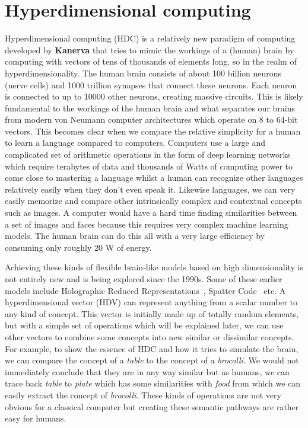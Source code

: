 \section{Hyperdimensional computing} 
Hyperdimensional computing (HDC) is a relatively new paradigm of computing developed by \textbf{Kanerva} \cite{Kanerva2009} that tries to mimic the workings of a (human) brain by computing with vectors of tens of thousands of elements long, so in the realm of hyperdimensionality. The human brain consists of about 100 billion neurons (nerve cells) and 1000 trillion synapses that connect these neurons. Each neuron is connected to up to 10000 other neurons, creating massive circuits. This is likely fundamental to the workings of the human brain and what separates our brains from modern von Neumann computer architectures which operate on 8 to 64-bit vectors. This becomes clear when we compare the relative simplicity for a human to learn a language compared to computers. Computers use a large and complicated set of arithmetic operations in the form of deep learning networks which require terabytes of data and thousands of Watts of computing power to come close to mastering a language whilst a human can recognize other languages relatively easily when they don't even speak it. Likewise languages, we can very easily memorize and compare other intrinsically complex and contextual concepts such as images. A computer would have a hard time finding similarities between a set of images and faces because this requires very complex machine learning models. The human brain can do this all with a very large efficiency by consuming only roughly 20 W of energy.

Achieving these kinds of flexible brain-like models based on high dimensionality is not entirely new and is being explored since the 1990s. Some of these earlier models include Holographic Reduced Representations~\cite{HRR}, Spatter Code~\cite{spatter} etc. A hyperdimensional vector (HDV) can represent anything from a scalar number to any kind of concept. This vector is initially made up of totally random elements, but with a simple set of operations which will be explained later, we can use other vectors to combine some concepts into new similar or dissimilar concepts. For example, to show the essence of HDC and how it tries to simulate the brain, we can compare the concept of a \textit{table} to the concept of a \textit{brocolli}. We would not immediately conclude that they are in any way similar but as humans, we can trace back \textit{table} to \textit{plate} which has some similarities with \textit{food} from which we can easily extract the concept of \textit{brocolli}. These kinds of operations are not very obvious for a classical computer but creating these semantic pathways are rather easy for humans.

